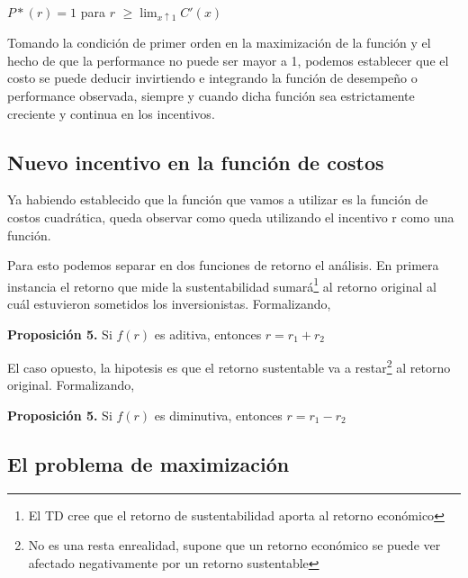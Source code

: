 \documentclass[11pt,letterpaper]{article}
\begin{document}
\begin{center}

$P*(r) = 1$  para  $r$  $\geq \lim_{x \uparrow  1} C'(x)$

\end{center}

\vspace{0,5cm}

Tomando la condición de primer orden en la maximización de la función y el hecho de que la performance no puede ser mayor a 1, podemos establecer que el costo se puede deducir invirtiendo e integrando la función de desempeño o performance observada, siempre y cuando dicha función sea estrictamente creciente y continua en los incentivos.

\subsection{Nuevo incentivo en la función de costos}

Ya habiendo establecido que la función que vamos a utilizar es la función de costos cuadrática, queda observar como queda utilizando el incentivo r como una función.

Para esto podemos separar en dos funciones de retorno el análisis. En primera instancia el retorno que mide la sustentabilidad sumará\footnote{El TD cree que el retorno de sustentabilidad aporta al retorno económico} al retorno original al cuál estuvieron sometidos los inversionistas. Formalizando,

\vspace{0,5 cm}

\textbf{Proposición 5.} Si $f(r)$ es aditiva, entonces $r = r_1 + r_2$

\vspace{0,5 cm}

El caso opuesto, la hipotesis es que el retorno sustentable va a restar\footnote{No es una resta enrealidad, supone que un retorno económico se puede ver afectado negativamente por un retorno sustentable} al retorno original. Formalizando,

\vspace{0,5 cm}

\textbf{Proposición 5.} Si $f(r)$ es diminutiva, entonces $r = r_1 - r_2$

\vspace{0,5 cm}

\subsection{El problema de maximización}
\end{document}
